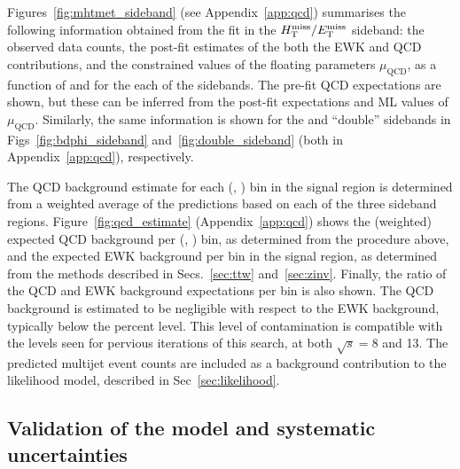 Figures~\ref{fig:mhtmet_sideband} (see Appendix~\ref{app:qcd})
summarises the following information obtained from the fit in the
$\mbox{$\mbox{$H_{\rm T}^{\rm miss}$} / \mbox{$E_\text{T}^{\rm miss}$}$}$ sideband: the observed data counts, the post-fit estimates
of the both the EWK and QCD contributions, and the constrained values
of the floating parameters $\mu_{\textrm{QCD}}$, as a function of
\njet and \scalht for the each of the sidebands. The pre-fit QCD
expectations are shown, but these can be inferred from the post-fit
expectations and ML values of $\mu_{\textrm{QCD}}$. Similarly, the
same information is shown for the \bdphi and ``double'' sidebands in
Figs~\ref{fig:bdphi_sideband} and~\ref{fig:double_sideband} (both in
Appendix~\ref{app:qcd}), respectively.

The QCD background estimate for each (\njet, \scalht) bin in the
signal region is determined from a weighted average of the predictions
based on each of the three sideband regions. 
Figure~\ref{fig:qcd_estimate} (Appendix~\ref{app:qcd}) shows the
(weighted) expected QCD background per (\njet, \scalht) bin, as
determined from the procedure above, and the expected EWK background
per bin in the signal region, as determined from the methods described
in Secs.~\ref{sec:ttw} and~\ref{sec:zinv}. Finally, the ratio of the
QCD and EWK background expectations per bin is also shown. The QCD
background is estimated to be negligible with respect to the EWK
background, typically below the percent level. This level of
contamination is compatible with the levels seen for pervious
iterations of this search, at both $\sqrt{s} = 8$ and 13\TeV. The
predicted multijet event counts are included as a background
contribution to the likelihood model, described in
Sec~\ref{sec:likelihood}.

\subsection{Validation of the model and systematic uncertainties}
\label{sec:qcdValidation}

